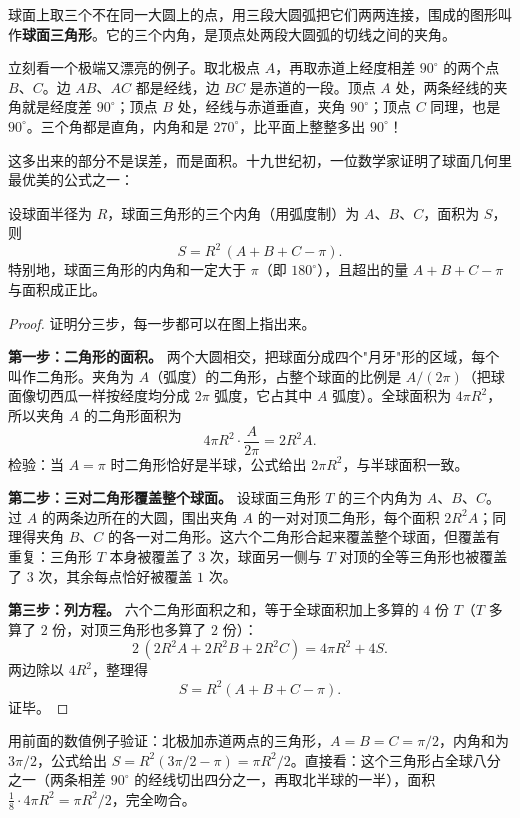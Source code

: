 \begin{dingyi}
球面上取三个不在同一大圆上的点，用三段大圆弧把它们两两连接，围成的图形叫作\textbf{球面三角形}。它的三个内角，是顶点处两段大圆弧的切线之间的夹角。
\end{dingyi}

立刻看一个极端又漂亮的例子。取北极点 $A$，再取赤道上经度相差 $90^\circ$ 的两个点 $B$、$C$。边 $AB$、$AC$ 都是经线，边 $BC$ 是赤道的一段。顶点 $A$ 处，两条经线的夹角就是经度差 $90^\circ$；顶点 $B$ 处，经线与赤道垂直，夹角 $90^\circ$；顶点 $C$ 同理，也是 $90^\circ$。三个角都是直角，内角和是 $270^\circ$，比平面上整整多出 $90^\circ$！

这多出来的部分不是误差，而是面积。十九世纪初，一位数学家证明了球面几何里最优美的公式之一：

\begin{dingli}[球面三角形的面积公式]
设球面半径为 $R$，球面三角形的三个内角（用弧度制）为 $A$、$B$、$C$，面积为 $S$，则
\[ S = R^2\,(A + B + C - \pi). \]
特别地，球面三角形的内角和一定大于 $\pi$（即 $180^\circ$），且超出的量 $A+B+C-\pi$ 与面积成正比。
\end{dingli}

\begin{proof}
证明分三步，每一步都可以在图上指出来。

\textbf{第一步：二角形的面积。} 两个大圆相交，把球面分成四个"月牙"形的区域，每个叫作二角形。夹角为 $A$（弧度）的二角形，占整个球面的比例是 $A/(2\pi)$（把球面像切西瓜一样按经度均分成 $2\pi$ 弧度，它占其中 $A$ 弧度）。全球面积为 $4\pi R^2$，所以夹角 $A$ 的二角形面积为
\[ 4\pi R^2 \cdot \frac{A}{2\pi} = 2R^2 A. \]
检验：当 $A=\pi$ 时二角形恰好是半球，公式给出 $2\pi R^2$，与半球面积一致。

\textbf{第二步：三对二角形覆盖整个球面。} 设球面三角形 $T$ 的三个内角为 $A$、$B$、$C$。过 $A$ 的两条边所在的大圆，围出夹角 $A$ 的一对对顶二角形，每个面积 $2R^2 A$；同理得夹角 $B$、$C$ 的各一对二角形。这六个二角形合起来覆盖整个球面，但覆盖有重复：三角形 $T$ 本身被覆盖了 $3$ 次，球面另一侧与 $T$ 对顶的全等三角形也被覆盖了 $3$ 次，其余每点恰好被覆盖 $1$ 次。

\textbf{第三步：列方程。} 六个二角形面积之和，等于全球面积加上多算的 $4$ 份 $T$（$T$ 多算了 $2$ 份，对顶三角形也多算了 $2$ 份）：
\[ 2\,(2R^2 A + 2R^2 B + 2R^2 C) = 4\pi R^2 + 4S. \]
两边除以 $4R^2$，整理得
\[ S = R^2 (A + B + C - \pi). \]
证毕。
\end{proof}

用前面的数值例子验证：北极加赤道两点的三角形，$A=B=C=\pi/2$，内角和为 $3\pi/2$，公式给出 $S = R^2(3\pi/2 - \pi) = \pi R^2 /2$。直接看：这个三角形占全球八分之一（两条相差 $90^\circ$ 的经线切出四分之一，再取北半球的一半），面积 $\frac{1}{8}\cdot 4\pi R^2 = \pi R^2/2$，完全吻合。

